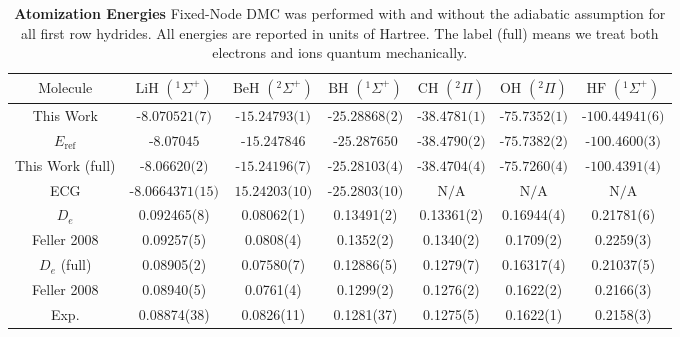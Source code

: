 \documentclass[aps,prl,superscriptaddress,groupedaddress]{revtex4}
\begin{document}
\begin{table}[htpb!]
\setlength{\extrarowheight}{3pt}
\begin{tabular}{*{1}{*{7}{c}}}
\hline\hline
$\text{Molecule}$ & $\text{LiH }(^1\Sigma^+)$ & $\text{BeH }(^2\Sigma^+)$ & $\text{BH }(^1\Sigma^+)$ & $\text{CH }(^2\Pi)$ & $\text{OH }(^2\Pi)$ & $\text{HF }(^1\Sigma^+)$ \\ \hline
This Work & $\text{-8.070521(7)}$ & $\text{-15.24793(1)}$ & $\text{-25.28868(2)}$ & $\text{-38.4781(1)}$ & $\text{-75.7352(1)}$ & $\text{-100.44941(6)}$ \\
$E_{\text{ref}}$ \footnotemark[1] \cite{Adamowicz_LiH,Koput_BeH,Miliordos_BH,Davidson_Atoms,Feller_Corrections} & $\text{-8.07045}$ & $\text{-15.247846}$ & $\text{-25.287650}$ & $\text{-38.4790(2)}$ & $\text{-75.7382(2)}$ & $\text{-100.4600(3)}$ \\
This Work (full) & $\text{-8.06620(2)}$ & $\text{-15.24196(7)}$ & $\text{-25.28103(4)}$ & $\text{-38.4704(4)}$ & $\text{-75.7260(4)}$ & $\text{-100.4391(4)}$ \\
ECG \cite{Bubin_LiH_noBO,Bubin_BeH_noBO,Bubin_BH_noBO} & $\text{-8.0664371(15)}$ & $\text{15.24203(10)}$ & $\text{-25.2803(10)}$ & $\text{N/A}$ & $\text{N/A}$ & $\text{N/A}$ \\
\hline
$D_{e}$ & 0.092465(8) & 0.08062(1) & 0.13491(2) & 0.13361(2) & 0.16944(4) & 0.21781(6) \\
Feller 2008\footnotemark[2] \cite{Feller_Corrections} & 0.09257(5) & 0.0808(4) & 0.1352(2) & 0.1340(2) & 0.1709(2) & 0.2259(3)\\
$D_{e}$ (full) & 0.08905(2)  & 0.07580(7)  & 0.12886(5) & 0.1279(7) & 0.16317(4) & 0.21037(5) \\
Feller 2008\footnotemark[3] \cite{Feller_Corrections} & 0.08940(5) & 0.0761(4) & 0.1299(2) & 0.1276(2) & 0.1622(2) & 0.2166(3)\\
Exp. \cite{CCCBDB} & 0.08874(38) & 0.0826(11) & 0.1281(37) & 0.1275(5) & 0.1622(1) & 0.2158(3) \\
\hline\hline
\end{tabular}
\caption{\textbf{Atomization Energies} Fixed-Node DMC was performed with and without the adiabatic assumption for all first row hydrides. All energies are reported in units of Hartree. The label (full) means we treat both electrons and ions quantum mechanically.}
\end{table} 
\end{document}
